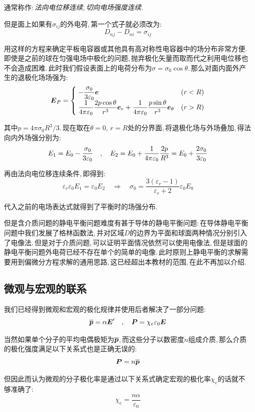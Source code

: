 通常称作:\,\emph{法向电位移连续,\,切向电场强度连续.}

但是面上如果有$\sigma_{ij}$的外电荷,\,第一个式子就必须改为:
\[D_{nj}-D_{ni}=\sigma_{ij}\]

用这样的方程来确定平板电容器或其他具有高对称性电容器中的场分布非常方便.\,即使是之前的球在匀强电场中极化的问题,\,抛弃极化矢量而取而代之利用电位移也不会造成困难.\,此时我们假设表面上的电荷分布为$\sigma=\sigma_0 \cos\theta$.\,那么对面内面外产生的退极化场场强为:
\[\boldsymbol{E}_P=\begin{cases}\displaystyle\;-\frac{\sigma_0	}{3\varepsilon_0} \boldsymbol{e}&(r<R)\\\displaystyle \; \frac{1}{4\pi\varepsilon_0} \frac{2p\cos\theta }{r^3}\boldsymbol{e}_r+\frac{1}{4\pi\varepsilon_0} \frac{p\sin\theta }{r^3}\boldsymbol{e}_\theta&(r>R)\end{cases}\]

其中$p=4\pi\sigma_0 R^3/3$.\,现在取在$\theta=0,\,r=R$处的分界面,\,将退极化场与外场叠加,\,得法向内外场强分别为:
\[E_1=E_0-\frac{\sigma_0	}{3\varepsilon_0}\quad ,\quad E_2 =E_0+\frac{1}{4\pi\varepsilon_0} \frac{2p}{R^3}=E_0+\frac{2\sigma_0	}{3\varepsilon_0}\]

再由法向电位移连续条件,\,即得到:
\[\varepsilon_r \varepsilon_0 E_1=\varepsilon_0 E_2\quad \Rightarrow \quad \sigma_0=\frac{3(\varepsilon_r-1)}{\varepsilon_r+2}\varepsilon_0 E_0\]

代入之前的电场表达式就得到了平衡时的场强分布.

\vspace{1cm}

但是含介质问题的静电平衡问题难度有甚于导体的静电平衡问题:\,在导体静电平衡问题中我们发展了格林函数法,\,并对区域$D$的边界为平面和球面两种情况分别引入了电像法.\,但是对于介质问题,\,可以证明平面情况依然可以使用电像法,\,但是球面的静电平衡问题外电荷已经不存在单个的简单的电像.\,此时原则上静电平衡的求解需要用到偏微分方程求解的通用思路,\,这已经超出本教材的范围,\,在此不再加以介绍.


\subsection{微观与宏观的联系}

我们已经得到微观和宏观的极化规律并使用后者解决了一部分问题:
\[\overline{\boldsymbol{p}}=\alpha \boldsymbol{E}'\quad ,\quad \boldsymbol{P}=\chi_e \varepsilon_0\boldsymbol{E}\]

当然如果单个分子的平均电偶极矩为$\overline{\boldsymbol{p}}$,\,而这些分子以数密度$n$组成介质,\,那么介质的极化强度满足以下关系式也是正确无误的:
\[\boldsymbol{P}=n\overline{\boldsymbol{p}}\]

但因此而认为微观的分子极化率是通过以下关系式确定宏观的极化率$\chi_e$的话就不够准确了:
\[\chi_e=\frac{n\alpha }{\varepsilon_0}\]

